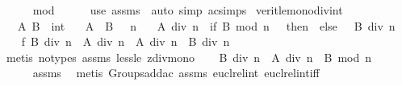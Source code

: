 \begin{isabellebody}
\ \ \ \ \isamarkupfalse%
\ mod\isanewline
\ \ \ \ \isamarkupfalse%
\ {\isacharparenleft}{\kern0pt}use\ assms{\isacharparenleft}{\kern0pt}{}{\isacharcomma}{\kern0pt}{}{\isacharparenright}{\kern0pt}\ \ {\isacartoucheopen}auto\ simp{\isacharcolon}{\kern0pt}\ ac{\isacharunderscore}{\kern0pt}simps{\isacartoucheclose}{\isacharparenright}{\kern0pt}\isanewline
{}\isamarkupfalse%
%
\endisatagproof
{\isafoldproof}%
%
\isadelimproof
\isanewline
%
\endisadelimproof
\isanewline
{}\isamarkupfalse%
\ verit{\isacharunderscore}{\kern0pt}le{\isacharunderscore}{\kern0pt}mono{\isacharunderscore}{\kern0pt}div{\isacharunderscore}{\kern0pt}int{\isacharcolon}{\kern0pt}\isanewline
\ \ \ A\ B\ {\isacharcolon}{\kern0pt}{\isacharcolon}{\kern0pt}\ int\isanewline
\ \ \ {\isachardoublequoteopen}A\ {\isacharless}{\kern0pt}\ B{\isachardoublequoteclose}\ {\isachardoublequoteopen}{}\ {\isacharless}{\kern0pt}\ n{\isachardoublequoteclose}\isanewline
\ \ \ {\isachardoublequoteopen}{\isacharparenleft}{\kern0pt}A\ div\ n{\isacharparenright}{\kern0pt}\ {\isacharplus}{\kern0pt}\ {\isacharparenleft}{\kern0pt}if\ B\ mod\ n\ {\isacharequal}{\kern0pt}\ {}\ then\ {}\ else\ {}{\isacharparenright}{\kern0pt}\ {\isasymle}\ {\isacharparenleft}{\kern0pt}B\ div\ n{\isacharparenright}{\kern0pt}{\isachardoublequoteclose}\isanewline
%
\isadelimproof
%
\endisadelimproof
%
\isatagproof
{}\isamarkupfalse%
\ {\isacharminus}{\kern0pt}\isanewline
\ \ \isamarkupfalse%
\ f{}{\isacharcolon}{\kern0pt}\ {\isachardoublequoteopen}B\ div\ n\ {\isacharequal}{\kern0pt}\ A\ div\ n\ {\isasymor}\ A\ div\ n\ {\isacharless}{\kern0pt}\ B\ div\ n{\isachardoublequoteclose}\isanewline
\ \ \ \ \isamarkupfalse%
\ {\isacharparenleft}{\kern0pt}metis\ {\isacharparenleft}{\kern0pt}no{\isacharunderscore}{\kern0pt}types{\isacharparenright}{\kern0pt}\ assms\ less{\isacharunderscore}{\kern0pt}le\ zdiv{\isacharunderscore}{\kern0pt}mono{}{\isacharparenright}{\kern0pt}\isanewline
\ \ \isamarkupfalse%
\ {\isachardoublequoteopen}B\ div\ n\ {\isasymnoteq}\ A\ div\ n\ {\isasymor}\ B\ mod\ n\ {\isasymnoteq}\ {}{\isachardoublequoteclose}\isanewline
\ \ \ \ \isamarkupfalse%
\ assms{\isacharparenleft}{\kern0pt}{}{\isacharparenright}{\kern0pt}\ \isamarkupfalse%
\ {\isacharparenleft}{\kern0pt}metis\ Groups{\isachardot}{\kern0pt}add{\isacharunderscore}{\kern0pt}ac{\isacharparenleft}{\kern0pt}{}{\isacharparenright}{\kern0pt}\ assms{\isacharparenleft}{\kern0pt}{}{\isacharparenright}{\kern0pt}\ eucl{\isacharunderscore}{\kern0pt}rel{\isacharunderscore}{\kern0pt}int\ eucl{\isacharunderscore}{\kern0pt}rel{\isacharunderscore}{\kern0pt}int{\isacharunderscore}{\kern0pt}iff\isanewline

\end{isabellebody}
